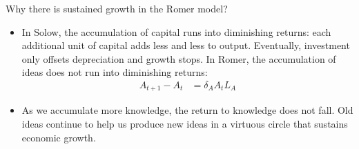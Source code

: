 \documentclass[10pt,aspectratio=169]{beamer}
\begin{document}
\begin{frame}{Why there is sustained growth in the Romer model?}
    \begin{itemize}
        \item In Solow, the accumulation of capital runs into diminishing returns: each additional unit of capital adds less and less to output.
        \itemvso Eventually, investment only offsets depreciation and growth stops.
        \itemvso In Romer, the accumulation of ideas does not run into diminishing returns:
        \begin{align*}
        A_{t+1}-A_t &= \delta_A A_t L_A
        \end{align*}
        \vspace{-0.6cm}
        \item As we accumulate more knowledge, the return to knowledge does not fall.
        \itemvso Old ideas continue to help us produce new ideas in a virtuous circle that sustains economic growth.
    \end{itemize}
\end{frame}
\end{document}
